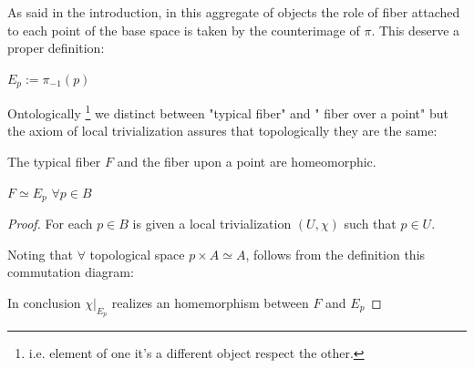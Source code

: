 \documentclass[a4paper,12pt]{scrartcl}    %
\begin{document}
As said in the introduction, in this aggregate of objects the role of fiber attached to each point of the base space is taken by the counterimage of $\pi$. 
This deserve a proper definition:
\begin{definition}
$E_{p} := \pi_{-1}(p) $
\end{definition}

Ontologically \footnote{i.e. element of one it's a different object respect the other.} we distinct between "typical fiber" and " fiber over a point" but the axiom of local trivialization assures that topologically they are the same:

\begin{lemma}
The typical fiber $F$ and the fiber upon a point are homeomorphic.
	\begin{thesis}
		$F \simeq E_{p} $ $\forall p \in B$ 
	\end{thesis}
\end{lemma}%
\begin{proof}
For each $p\in B$ is given a local trivialization $(U, \chi)$ such that $p \in U$.

Noting that $\forall $ topological space  ${p} \times A \simeq A$, follows from the definition this commutation diagram:


In conclusion $\chi \vert _{E_{p}}$ realizes an homemorphism between $F$ and $E_{p}$

\end{proof}


\end{document}
